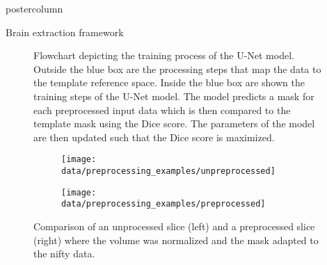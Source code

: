 \begin{frame}
\begin{columns}
\begin{column}{.42\textwidth}
\begin{beamercolorbox}[center]{postercolumn}
\begin{minipage}{.98\textwidth}
{\begin{myblock}{Brain extraction framework}
                                \begin{figure}
                                    \centering
                                    \vspace{0.5em}
                                    \caption{Flowchart depicting the training process of the U-Net model. Outside the blue box are the processing steps that map the data to the template reference space. Inside the blue box are shown the training steps of the U-Net model. The model predicts a mask for each preprocessed input data which is then compared to the template mask using the Dice score. The parameters of the model are then updated such that the Dice score is maximized.}
                                    \label{training_graph}
                                \end{figure}

                                \begin{figure}
                                    \centering
                                    \begin{subfigure}{0.25\textwidth}
                                        \centering
                                        \texttt{[image: data/preprocessing\_examples/unpreprocessed]}
                                    \end{subfigure}
                                    \hspace{2em}
                                    \begin{subfigure}{0.25\textwidth}
                                        \centering
                                        \texttt{[image: data/preprocessing\_examples/preprocessed]}
                                    \end{subfigure}
                                    \vspace{0.5em}
                                    \caption{Comparison of an unprocessed slice (left) and a preprocessed slice (right) where the volume was normalized and the mask adapted to the nifty data.}
                                    \label{preprocessing_xample}
                                \end{figure}
                            \end{myblock}\vfill





}
\end{minipage}
\end{beamercolorbox}
\end{column}
\end{columns}
\end{frame}
